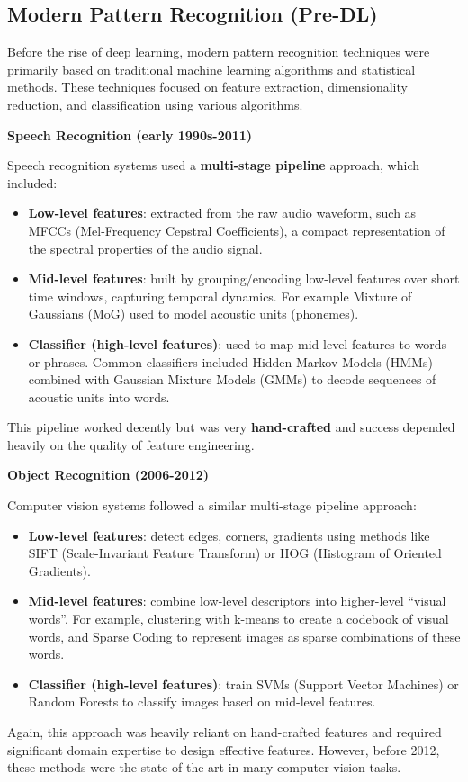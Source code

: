 \subsection{Modern Pattern Recognition (Pre-DL)}

Before the rise of deep learning, modern pattern recognition techniques were primarily based on traditional machine learning algorithms and statistical methods. These techniques focused on feature extraction, dimensionality reduction, and classification using various algorithms.

\begin{flushleft}
    \textcolor{Green3}{ \textbf{Speech Recognition (early 1990s-2011)}}
\end{flushleft}
Speech recognition systems used a \textbf{multi-stage pipeline} approach, which included:
\begin{itemize}
    \item \textbf{Low-level features}: extracted from the raw audio waveform, such as MFCCs (Mel-Frequency Cepstral Coefficients), a compact representation of the spectral properties of the audio signal.

    \item \textbf{Mid-level features}: built by grouping/encoding low-level features over short time windows, capturing temporal dynamics. For example Mixture of Gaussians (MoG) used to model acoustic units (phonemes).
    
    \item \textbf{Classifier (high-level features)}: used to map mid-level features to words or phrases. Common classifiers included Hidden Markov Models (HMMs) combined with Gaussian Mixture Models (GMMs) to decode sequences of acoustic units into words.
\end{itemize}
This pipeline worked decently but was very \textbf{hand-crafted} and success depended heavily on the quality of feature engineering.


\highspace
\begin{flushleft}
    \textcolor{Green3}{ \textbf{Object Recognition (2006-2012)}}
\end{flushleft}
Computer vision systems followed a similar multi-stage pipeline approach:
\begin{itemize}
    \item \textbf{Low-level features}: detect edges, corners, gradients using methods like SIFT (Scale-Invariant Feature Transform) or HOG (Histogram of Oriented Gradients).
    \item \textbf{Mid-level features}: combine low-level descriptors into higher-level ``visual words''. For example, clustering with k-means to create a codebook of visual words, and Sparse Coding to represent images as sparse combinations of these words.
    \item \textbf{Classifier (high-level features)}: train SVMs (Support Vector Machines) or Random Forests to classify images based on mid-level features.
\end{itemize}
Again, this approach was heavily reliant on hand-crafted features and required significant domain expertise to design effective features. However, before 2012, these methods were the state-of-the-art in many computer vision tasks.

